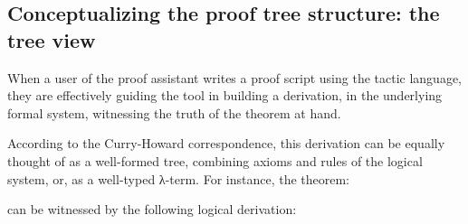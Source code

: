 \subsection{Conceptualizing the proof tree  structure: the tree view}

When a user of the \Coq{} proof assistant writes a proof script using the
\Ltac{} tactic language, they are effectively guiding the tool in building a
derivation, in the underlying formal system, witnessing the truth of the theorem
at hand.

According to the Curry-Howard correspondence, this derivation can be equally
thought of as a well-formed tree, combining axioms and rules of the logical
system, or, as a well-typed λ-term.  For instance, the theorem:


can be witnessed by the following logical derivation:

